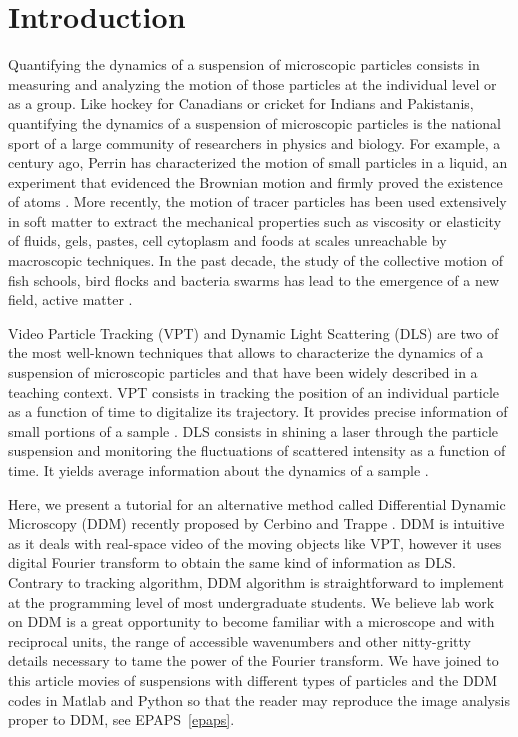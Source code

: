 \documentclass[%
 aip,
 jmp,%
 amsmath,amssymb,
reprint,%
]{revtex4-1}
\begin{document}
\section{\label{sec:level1}Introduction}

Quantifying the dynamics of a suspension of microscopic particles consists in measuring and analyzing the motion of those particles at the individual level or as a group. Like hockey for Canadians or cricket for Indians and Pakistanis, quantifying the dynamics of a suspension of microscopic particles is the national sport of a large community of researchers in physics and biology. For example, a century ago, Perrin has characterized the motion of small particles in a liquid, an experiment that evidenced the Brownian motion and firmly proved the existence of atoms \cite{22_perrin2014atomes}. More recently, the motion of tracer particles has been used extensively in soft matter\cite{pt1990witten, pt1964reiner} to extract the mechanical properties such as viscosity or elasticity of fluids, gels\cite{Mason1997, Chen2010}, pastes, cell cytoplasm\cite{Fabry2001,Lau2003} and foods at scales unreachable by macroscopic techniques. In the past decade, the study of the collective motion of fish schools, bird flocks and bacteria swarms has lead to the emergence of a new field, active matter \cite{Bricard2013}.

Video Particle Tracking (VPT) and Dynamic Light Scattering (DLS) are two of the most well-known techniques that allows to characterize the dynamics of a suspension of microscopic particles and that have been widely described in a teaching context. VPT consists in tracking the position of an individual particle as a function of time to digitalize its trajectory. It provides precise information of small portions of a sample \citep{Crocker1996,ajp2013catipovic,Maurer2014}. DLS consists in shining a laser through the particle suspension and monitoring the fluctuations of scattered intensity as a function of time\cite{ajp1969clark}. It yields average information about the dynamics of a sample \citep{18_sartor2003dynamic, ajp1999goldburg,ajp1969clark}.

Here, we present a tutorial for an alternative method called Differential Dynamic Microscopy (DDM) recently proposed by Cerbino and Trappe \cite{2_DDM}. DDM is intuitive as it deals with real-space video of the moving objects like VPT, however it uses digital Fourier transform to obtain the same kind of information as DLS.  Contrary to tracking algorithm, DDM algorithm is straightforward to implement at the programming level of most undergraduate students. We believe lab work on DDM is a great opportunity to become familiar with a microscope and with reciprocal units, the range of accessible wavenumbers and other nitty-gritty details necessary to tame the power of the Fourier transform\cite{ajp1976higgins, ajp2001whiford}. We have joined to this article movies of suspensions with different types of particles and the DDM codes in Matlab and Python so that the reader may reproduce the image analysis proper to DDM, see EPAPS~\ref{epaps}.
\end{document}
